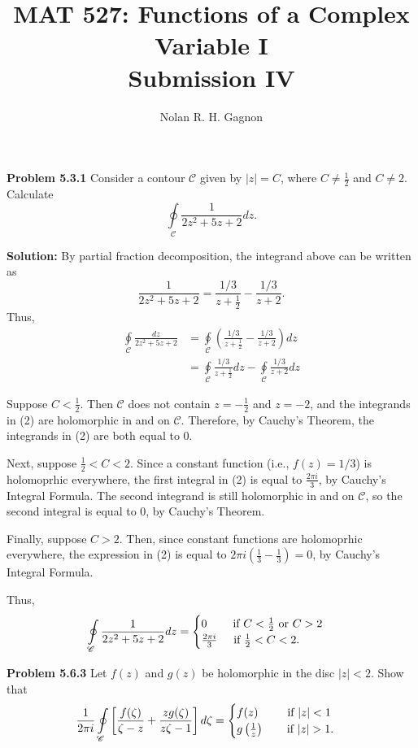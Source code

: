 \documentclass{article}
\title{MAT 527:  Functions of a Complex Variable I \\
	   \textbf{Submission IV}}
\author{Nolan R. H. Gagnon}
\newcommand{\mybox}{%
    \collectbox{%
        \setlength{\fboxsep}{1pt}%
        \fbox{\BOXCONTENT}%
    }%
}
\begin{document}
\maketitle
\noindent\mybox{\textbf{Problem 5.3.1}}  Consider a contour $\mathscr{C}$ given by $|z| = C$, where $C \neq \frac{1}{2}$ and $C \neq 2$.  Calculate $$\oint\limits_{\mathscr{C}} \frac{1}{2z^2 + 5z + 2} dz.$$

\vspace{5mm}

\noindent\mybox{\textbf{Solution:}}  By partial fraction decomposition, the integrand above can be written as $$\frac{1}{2z^2+5z+2} = \frac{1/3}{z+\frac{1}{2}} - \frac{1/3}{z+2}.$$  Thus,
\begin{align}
\oint\limits_{\mathscr{C}} \frac{dz}{2z^2 + 5z + 2} &= \oint\limits_{\mathscr{C}} \left(\frac{1/3}{z+\frac{1}{2}} - \frac{1/3}{z+2} \right) dz \\
&= \oint\limits_{\mathscr{C}} \frac{1/3}{z+\frac{1}{2}} dz - \oint\limits_{\mathscr{C}} \frac{1/3}{z+2} dz
\end{align}


\noindent Suppose $C < \frac{1}{2}$.  Then $\mathscr{C}$ does not contain $z = -\frac{1}{2}$ and $z = - 2$, and the integrands in (2) are holomorphic in and on $\mathscr{C}$.  Therefore, by Cauchy's Theorem, the integrands in (2) are both equal to 0.  

\noindent Next, suppose $\frac{1}{2} < C < 2$.  Since a constant function (i.e., $f(z) = 1/3$) is holomoprhic everywhere, the first integral in (2) is equal to $\frac{2\pi i}{3}$, by Cauchy's Integral Formula.  The second integrand is still holomorphic in and on $\mathscr{C}$, so the second integral is equal to $0$, by Cauchy's Theorem.  

\noindent Finally, suppose $C > 2$.  Then, since constant functions are holomoprhic everywhere, the expression in (2) is equal to $2\pi i \left(\frac{1}{3} - \frac{1}{3}\right) = 0$, by Cauchy's Integral Formula.

\noindent Thus, $$\oint\limits_{\mathscr{C}} \frac{1}{2z^2 + 5z + 2} dz =
\begin{cases}
0 \hspace{8mm} \text{if } C < \frac{1}{2} \text{ or } C > 2 \\
\frac{2\pi i}{3} \hspace{5mm} \text{if } \frac{1}{2} < C < 2.
\end{cases}
$$

\pagebreak

\noindent\mybox{\textbf{Problem 5.6.3}}  Let $f(z)$ and $g(z)$ be holomorphic in the disc $|z| < 2$.  Show that $$\frac{1}{2\pi i}\oint\limits_{\mathscr{C}}\left[\frac{f(\zeta)}{\zeta - z} + \frac{zg(\zeta)}{z\zeta - 1}\right] d\zeta = \begin{cases}
f(z) \hspace{9mm} \text{if } |z| < 1 \\
g\left(\frac{1}{z}\right) \hspace{7mm} \text{if } |z| > 1.
\end{cases}
$$
\end{document}
